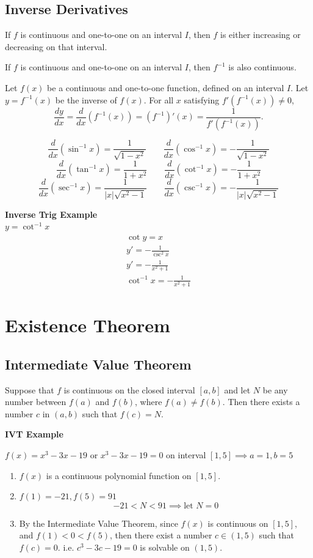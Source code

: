 \documentclass{article}
\newcommand{\theorem}[2]{\begin{tcolorbox}[title={#1},colback=blue!5!white,colframe=blue!75!black,parbox=false] #2 \end{tcolorbox}}
\begin{document}
\subsection{Inverse Derivatives}
\theorem{ Theorem 1 } {If $f$ is continuous and one-to-one on an interval $I$, then $f$ is either increasing or decreasing on that interval.}\theorem{ Theorem 2 } {If $f$ is continuous and one-to-one on an interval $I$, then $f^{-1}$ is also continuous.}\theorem{ Theorem 3 } {Let $f(x)$ be a continuous and one-to-one function, defined on an interval $I$. Let $y = f^{-1}(x)$ be the inverse of $f(x)$. For all $x$ satisfying $f'(f^{-1}(x)) \neq 0$,$$ \frac{dy}{dx} = \frac{d}{dx}(f^{-1}(x)) = (f^{-1})'(x) = \frac{1}{f'(f^{-1}(x))}. $$}

\theorem{Inverse Trigonometric Derivatives} {$$ \frac{d}{dx}(\sin^{-1} x) = \frac{1}{\sqrt{1 - x^2}} \qquad \frac{d}{dx}(\cos^{-1} x) = -\frac{1}{\sqrt{1 - x^2}} $$$$ \frac{d}{dx}(\tan^{-1} x) = \frac{1}{1 + x^2} \qquad \frac{d}{dx}(\cot^{-1} x) = -\frac{1}{1 + x^2} $$$$ \frac{d}{dx}(\sec^{-1} x) = \frac{1}{|x|\sqrt{x^2 - 1}} \qquad \frac{d}{dx}(\csc^{-1} x) = -\frac{1}{|x|\sqrt{x^2 - 1}} $$}

\textbf{Inverse Trig Example}\\
$y=\cot^{-1} x$
\begin{gather*}
    \cot y=x\\
    y'=-\frac{1}{\csc^2 x}\\
    y'=-\frac{1}{x^2+1}\\
    \boxed{\cot^{-1} x=-\frac{1}{x^2+1}}
\end{gather*}

\section{Existence Theorem}

\subsection{Intermediate Value Theorem}
\theorem{ The Intermediate Value Theorem (IVT): }{
Suppose that $f$ is continuous on the closed interval $[a, b]$ and let $N$ be any number between $f(a)$ and $f(b)$, where $f(a)\ne f(b)$. Then there exists a number $c$ in $(a, b)$ such that $f(c)=N.$ 
}

\textbf{IVT Example}

$f(x)=x^3-3x-19 $ or $ x^3-3x-19=0$ on interval $[1,5] \implies a=1,b=5$
\begin{enumerate}
    \item $f(x)$ is a continuous polynomial function on $[1,5]$.
    \item $f(1)=-21, f(5)=91$
\[
-21<N<91 \implies \text{let }N=0
\]
    \item By the Intermediate Value Theorem, since $f(x)$ is continuous on $[1,5]$, and $f(1)<0<f(5)$, then there exist a number $c\in (1,5)$ such that $f(c)=0$. i.e. $c^3-3c-19=0$ is solvable on $(1,5)$.
\end{enumerate}
\end{document}
